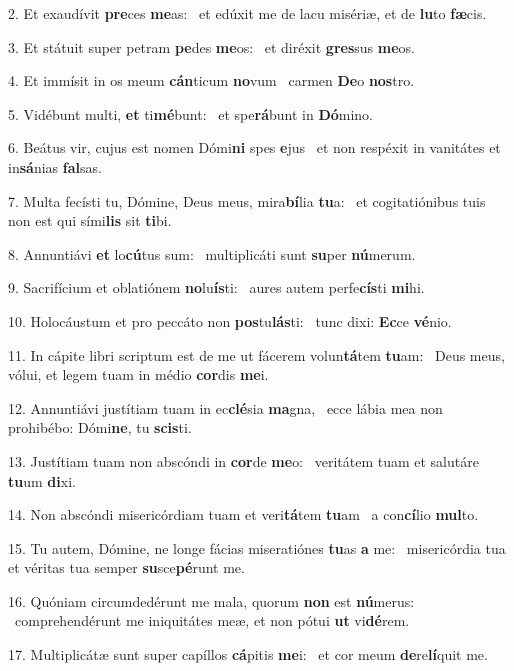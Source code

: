 2. Et exaudívit \textbf{pre}ces \textbf{me}as: \ast\  et edúxit me de lacu misériæ, et de \textbf{lu}to \textbf{fæ}cis.\

3. Et státuit super petram \textbf{pe}des \textbf{me}os: \ast\  et diréxit \textbf{gres}sus \textbf{me}os.\

4. Et immísit in os meum \textbf{cán}ticum \textbf{no}vum \ast\  carmen \textbf{De}o \textbf{nos}tro.\

5. Vidébunt multi, \textbf{et} ti\textbf{mé}bunt: \ast\  et spe\textbf{rá}bunt in \textbf{Dó}mino.\

6. Beátus vir, cujus est nomen Dómi\textbf{ni} spes \textbf{e}jus \ast\  et non respéxit in vanitátes et in\textbf{sá}nias \textbf{fal}sas.\

7. Multa fecísti tu, Dómine, Deus meus, mira\textbf{bí}lia \textbf{tu}a: \ast\  et cogitatiónibus tuis non est qui sími\textbf{lis} sit \textbf{ti}bi.\

8. Annuntiávi \textbf{et} lo\textbf{cú}tus sum: \ast\  multiplicáti sunt \textbf{su}per \textbf{nú}merum.\

9. Sacrifícium et oblatiónem \textbf{no}lu\textbf{ís}ti: \ast\  aures autem perfe\textbf{cís}ti \textbf{mi}hi.\

10. Holocáustum et pro peccáto non \textbf{pos}tu\textbf{lás}ti: \ast\  tunc dixi: \textbf{Ec}ce \textbf{vé}nio.\

11. In cápite libri scriptum est de me ut fácerem volun\textbf{tá}tem \textbf{tu}am: \ast\  Deus meus, vólui, et legem tuam in médio \textbf{cor}dis \textbf{me}i.\

12. Annuntiávi justítiam tuam in ec\textbf{clé}sia \textbf{ma}gna, \ast\  ecce lábia mea non prohibébo: Dómi\textbf{ne}, tu \textbf{scis}ti.\

13. Justítiam tuam non abscóndi in \textbf{cor}de \textbf{me}o: \ast\  veritátem tuam et salutáre \textbf{tu}um \textbf{di}xi.\

14. Non abscóndi misericórdiam tuam et veri\textbf{tá}tem \textbf{tu}am \ast\  a con\textbf{cí}lio \textbf{mul}to.\

15. Tu autem, Dómine, ne longe fácias miseratiónes \textbf{tu}as \textbf{a} me: \ast\  misericórdia tua et véritas tua semper \textbf{su}sce\textbf{pé}runt me.\

16. Quóniam circumdedérunt me mala, quorum \textbf{non} est \textbf{nú}merus: \ast\  comprehendérunt me iniquitátes meæ, et non pótui \textbf{ut} vi\textbf{dé}rem.\

17. Multiplicátæ sunt super capíllos \textbf{cá}pitis \textbf{me}i: \ast\  et cor meum \textbf{de}re\textbf{lí}quit me.\

